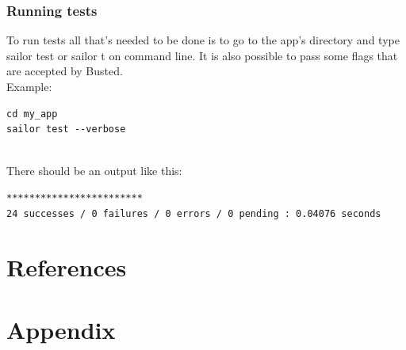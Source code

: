 \documentclass{article}
\begin{document}
\subsubsection{Running tests}

To run tests all that's needed to be done is to go to the app's directory and type sailor test or sailor t on command line. It is also possible to pass some flags that are accepted by Busted.\\

Example:
\begin{lstlisting}[frame=single]
cd my_app
sailor test --verbose
\end{lstlisting}\\

There should be an output like this:
\begin{lstlisting}[frame=single]
************************
24 successes / 0 failures / 0 errors / 0 pending : 0.04076 seconds
\end{lstlisting}






	\newpage

\section{References}
	\printbibliography[title={Books},type=book,heading=subbibnumbered]
	\printbibliography[title={Articles},type=article,heading=subbibnumbered]
	\printbibliography[title={Websites},type=misc,heading=subbibnumbered]

	\newpage
	\section{Appendix}
	\begin{appendix}
	 \listoffigures
  \listoftables
	\end{appendix}
\end{document}
